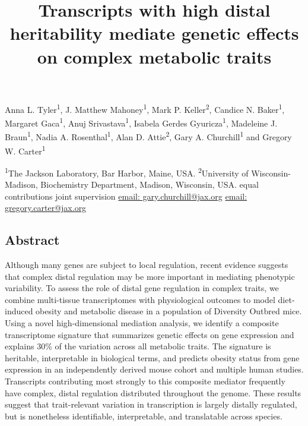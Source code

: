 \documentclass[
]{article}
\title{Transcripts with high distal heritability mediate genetic effects
on complex metabolic traits}
\author{}
\date{\vspace{-2.5em}}
\begin{document}
\maketitle

Anna L. Tyler\textsuperscript{1}\text{*}, J. Matthew
Mahoney\textsuperscript{1}\text{*}, Mark P. Keller\textsuperscript{2},
Candice N. Baker\textsuperscript{1}, Margaret Gaca\textsuperscript{1},
Anuj Srivastava\textsuperscript{1}, Isabela Gerdes
Gyuricza\textsuperscript{1}, Madeleine J. Braun\textsuperscript{1},
Nadia A. Rosenthal\textsuperscript{1}, Alan D. Attie\textsuperscript{2},
Gary A.
Churchill\textsuperscript{1}\textsuperscript{\textdagger}\textsuperscript{\Letter}
and Gregory W.
Carter\textsuperscript{1}\textsuperscript{\textdagger}\textsuperscript{\Letter}

\textsuperscript{1}The Jackson Laboratory, Bar Harbor, Maine, USA.
\textsuperscript{2}University of Wisconsin-Madison, Biochemistry
Department, Madison, Wisconsin, USA. \text{*}equal contributions
\textsuperscript{\textdagger} joint supervision
\textsuperscript{\Letter}\href{mailto:gary.churchill@jax.org}{email: gary.churchill@jax.org}
\textsuperscript{\Letter}\href{mailto:gregory.carter@jax.org}{email: gregory.carter@jax.org}

\subsection{Abstract}\label{abstract}

Although many genes are subject to local regulation, recent evidence
suggests that complex distal regulation may be more important in
mediating phenotypic variability. To assess the role of distal gene
regulation in complex traits, we combine multi-tissue transcriptomes
with physiological outcomes to model diet-induced obesity and metabolic
disease in a population of Diversity Outbred mice. Using a novel
high-dimensional mediation analysis, we identify a composite
transcriptome signature that summarizes genetic effects on gene
expression and explains 30\% of the variation across all metabolic
traits. The signature is heritable, interpretable in biological terms,
and predicts obesity status from gene expression in an independently
derived mouse cohort and multiple human studies. Transcripts
contributing most strongly to this composite mediator frequently have
complex, distal regulation distributed throughout the genome. These
results suggest that trait-relevant variation in transcription is
largely distally regulated, but is nonetheless identifiable,
interpretable, and translatable across species.
\end{document}
